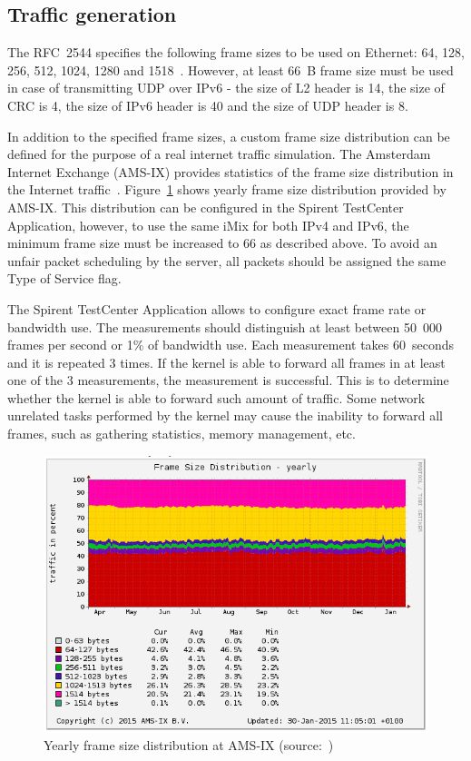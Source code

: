 
\subsection{Traffic generation}
The RFC~2544 specifies the following frame sizes to be used on Ethernet:
64, 128, 256, 512, 1024, 1280 and 1518~\cite{rfc2544}.
However, at least 66~B frame size must be used in case of transmitting UDP over IPv6 - the size of L2 header is 14,
the size of CRC is 4, the size of IPv6 header is 40 and the size of UDP header is 8.

In addition to the specified frame sizes, a custom frame size distribution can be defined for the purpose of
a real internet traffic simulation.
The Amsterdam Internet Exchange (AMS-IX) provides
statistics of the frame size distribution in the Internet traffic~\cite{amsix-frame-size}.
Figure~\ref{fig:analysis-amsix-frame-size} shows yearly frame size distribution provided by AMS-IX.
This distribution can be configured in the Spirent TestCenter Application, however,
to use the same iMix for both IPv4 and IPv6, the minimum frame size must be increased to 66 as described above.
To avoid an unfair packet scheduling by the server, all packets should be assigned the same Type of Service flag.

The Spirent TestCenter Application allows to configure exact frame rate or bandwidth use.
The measurements should distinguish at least between 50~000 frames per second or 1\% of bandwidth use.
Each measurement takes 60~seconds and it is repeated 3 times.
If the kernel is able to forward all frames in at least one of the 3 measurements,
the measurement is successful.
This is to determine whether the kernel is able to forward such amount of traffic.
Some network unrelated tasks performed by the kernel may cause the inability to forward all frames,
such as gathering statistics, memory management, etc.

\begin{figure}
	\centering
	\includegraphics[width=14.5cm,keepaspectratio]{fig/amsix.png}
	\caption{Yearly frame size distribution at AMS-IX (source:~\cite{amsix-frame-size})}
	\label{fig:analysis-amsix-frame-size}
\end{figure}
